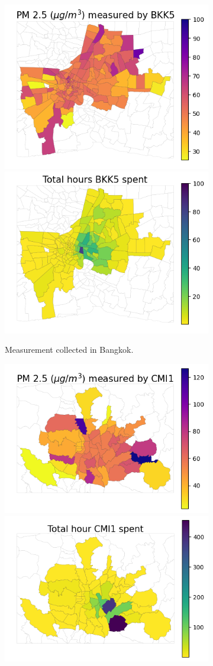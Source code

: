 \documentclass[sigconf,screen,natbib=true]{acmart}
\begin{document}
\begin{figure}
\begin{subfigure}[t]{0.49\textwidth}
        \includegraphics[width=.5\linewidth]{figures/map/BKK5_PM25.png}\includegraphics[width=.5\linewidth]{figures/map/BKK5_time.png}
        \caption{Measurement collected in Bangkok.}
\end{subfigure}\hfill \begin{subfigure}[t]{0.49\textwidth}
        \centering
        \includegraphics[width=.5\linewidth]{figures/map/CMI1_PM25.png}\includegraphics[width=.5\linewidth]{figures/map/CMI1_time.png}

\end{subfigure}
\end{figure}
\end{document}
